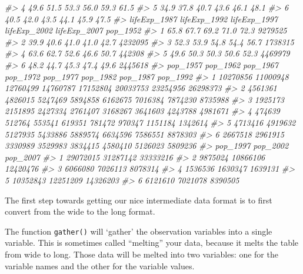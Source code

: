 \documentclass[]{book}
\newenvironment{Shaded}{\begin{snugshade}}{\end{snugshade}}
\newcommand{\CommentTok}[1]{\textcolor[rgb]{0.56,0.35,0.01}{\textit{#1}}}
\begin{document}
\begin{Shaded}
\begin{Highlighting}[]
\CommentTok{#> 4         49.6         51.5         53.3         56.0         59.3         61.5}
\CommentTok{#> 5         34.9         37.8         40.7         43.6         46.1         48.1}
\CommentTok{#> 6         40.5         42.0         43.5         44.1         45.9         47.5}
\CommentTok{#>   lifeExp_1987 lifeExp_1992 lifeExp_1997 lifeExp_2002 lifeExp_2007 pop_1952}
\CommentTok{#> 1         65.8         67.7         69.2         71.0         72.3  9279525}
\CommentTok{#> 2         39.9         40.6         41.0         41.0         42.7  4232095}
\CommentTok{#> 3         52.3         53.9         54.8         54.4         56.7  1738315}
\CommentTok{#> 4         63.6         62.7         52.6         46.6         50.7   442308}
\CommentTok{#> 5         49.6         50.3         50.3         50.6         52.3  4469979}
\CommentTok{#> 6         48.2         44.7         45.3         47.4         49.6  2445618}
\CommentTok{#>   pop_1957 pop_1962 pop_1967 pop_1972 pop_1977 pop_1982 pop_1987 pop_1992}
\CommentTok{#> 1 10270856 11000948 12760499 14760787 17152804 20033753 23254956 26298373}
\CommentTok{#> 2  4561361  4826015  5247469  5894858  6162675  7016384  7874230  8735988}
\CommentTok{#> 3  1925173  2151895  2427334  2761407  3168267  3641603  4243788  4981671}
\CommentTok{#> 4   474639   512764   553541   619351   781472   970347  1151184  1342614}
\CommentTok{#> 5  4713416  4919632  5127935  5433886  5889574  6634596  7586551  8878303}
\CommentTok{#> 6  2667518  2961915  3330989  3529983  3834415  4580410  5126023  5809236}
\CommentTok{#>   pop_1997 pop_2002 pop_2007}
\CommentTok{#> 1 29072015 31287142 33333216}
\CommentTok{#> 2  9875024 10866106 12420476}
\CommentTok{#> 3  6066080  7026113  8078314}
\CommentTok{#> 4  1536536  1630347  1639131}
\CommentTok{#> 5 10352843 12251209 14326203}
\CommentTok{#> 6  6121610  7021078  8390505}
\end{Highlighting}
\end{Shaded}

The first step towards getting our nice intermediate data format is to
first convert from the wide to the long format.

The function \texttt{gather()} will `gather' the observation variables
into a single variable. This is sometimes called ``melting'' your data,
because it melts the table from wide to long. Those data will be melted
into two variables: one for the variable names and the other for the
variable values.
\end{document}

